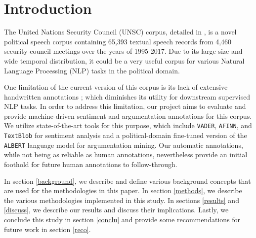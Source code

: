\section{Introduction}

The United Nations Security Council (UNSC) corpus, detailed in \citet{schnfeld2019security}, is a novel political speech corpus containing 65,393 textual speech records from 4,460 security council meetings over the years of 1995-2017. Due to its large size and wide temporal distribution, it could be a very useful corpus for various Natural Language Processing (NLP) tasks in the political domain.

One limitation of the current version of this corpus is its lack of extensive handwritten annotations \citep{schnfeld2019security}; which diminishes its utility for downstream supervised NLP tasks. In order to address this limitation, our project aims to evaluate and provide machine-driven sentiment and argumentation annotations for this corpus. We utilize state-of-the-art tools for this purpose, which include \texttt{VADER}, \texttt{AFINN}, and \texttt{TextBlob} for sentiment analysis and a political-domain fine-tuned version of the \texttt{ALBERT} language model for argumentation mining. Our automatic annotations, while not being as reliable as human annotations, nevertheless provide an initial foothold for future human annotations to follow-through.

In section \ref{background}, we describe and define various background concepts that are used for the methodologies in this paper. In section \ref{methods}, we describe the various methodologies implemented in this study. In sections \ref{results} and \ref{discuss}, we describe our results and discuss their implications. Lastly, we conclude this study in section \ref{conclu} and provide some recommendations for future work in section \ref{reco}.